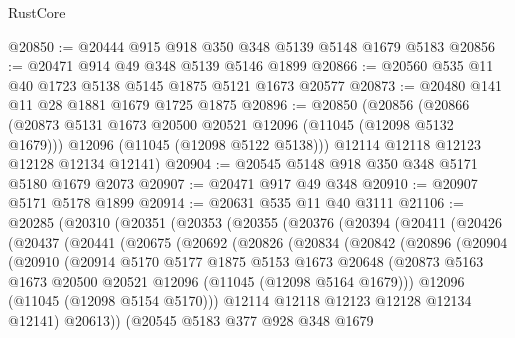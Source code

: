 \begin{lexlean}{RustCore}
\begin{coremodule}
@20850 := @20444 @915 @918 @350 @348 @5139 @5148 @1679 @5183
@20856 := @20471 @914 @49 @348 @5139 @5146 @1899
@20866 := @20560 @535 @11 @40 @1723 @5138 @5145 @1875 @5121 @1673 @20577
@20873 := @20480 @141 @11 @28 @1881 @1679 @1725 @1875
@20896 := @20850
    (@20856
      (@20866
        (@20873 @5131 @1673 @20500 @20521 @12096 (@11045 (@12098 @5132 @1679)))
        @12096
        (@11045 (@12098 @5122 @5138)))
      @12114
      @12118
      @12123
      @12128
      @12134
      @12141)
@20904 := @20545 @5148 @918 @350 @348 @5171 @5180 @1679 @2073
@20907 := @20471 @917 @49 @348
@20910 := @20907 @5171 @5178 @1899
@20914 := @20631 @535 @11 @40 @3111
@21106 := @20285
    (@20310
      (@20351
        (@20353
          (@20355
            (@20376
              (@20394
                (@20411
                  (@20426
                    (@20437
                      (@20441
                        (@20675
                          (@20692
                            (@20826
                              (@20834
                                (@20842
                                  (@20896
                                    (@20904
                                      (@20910
                                        (@20914
                                          @5170
                                          @5177
                                          @1875
                                          @5153
                                          @1673
                                          @20648
                                          (@20873
                                            @5163
                                            @1673
                                            @20500
                                            @20521
                                            @12096
                                            (@11045 (@12098 @5164 @1679)))
                                          @12096
                                          (@11045 (@12098 @5154 @5170)))
                                        @12114
                                        @12118
                                        @12123
                                        @12128
                                        @12134
                                        @12141)
                                      @20613))
                                  (@20545
                                    @5183
                                    @377
                                    @928
                                    @348
                                    @1679

\end{coremodule}
\end{lexlean}
